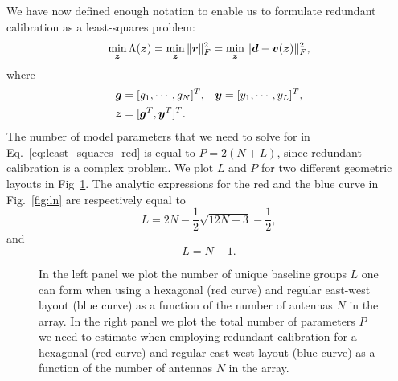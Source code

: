\documentclass[useAMS,usenatbib]{mn2e}
\newcommand{\bz}{\bmath{z}}
\newcommand{\br}{\bmath{r}}
\newcommand{\bg}{\bmath{g}}
\newcommand{\bd}{\bmath{d}}
\newcommand{\bv}{\bmath{v}}
\newcommand{\by}{\bmath{y}}
\begin{document}
We have now defined enough notation to enable us to formulate redundant calibration as a least-squares problem:
\begin{equation}
\label{eq:least_squares_red}
\min_{\bz} \Lambda(\bz) = \min_{\bz} \|\br\|_F^2 = \min_{\bz} \|\bd - \bv(\bz)\|_F^2, 
\end{equation}
where
\begin{align}
 \bg &=[g_1,\cdots,g_N]^T, & \by &= [y_1,\cdots,y_L]^T,\nonumber\\
 \bz &= [\bg^T,\by^T]^T. &  &\label{eq:parm_definitions}
 \end{align}
The number of model parameters that we need to solve for in Eq.~\eqref{eq:least_squares_red} is equal to $P = 2(N+L)$, since redundant calibration is a complex problem.
We plot $L$ and $P$ for two different geometric layouts in Fig~\ref{fig:pl}.
The analytic expressions for the red and the blue curve in Fig.~\ref{fig:ln} are respectively equal to
\begin{equation}
L = 2N-\frac{1}{2}\sqrt{12N-3}-\frac{1}{2}, 
\end{equation}
and
\begin{equation}
L = N - 1. 
\end{equation}


\begin{figure}
\centering
{}
\caption{In the left panel we plot the number of unique baseline groups $L$ one can form when using a hexagonal (red curve) and regular east-west layout (blue curve) as 
a function of the number of antennas $N$ in the array. In the right panel we plot the total number of parameters $P$ we need to estimate when employing redundant calibration for a hexagonal (red curve) and regular east-west layout (blue curve) as 
a function of the number of antennas $N$ in the array. 
\label{fig:pl}} 
\end{figure}
\end{document}
